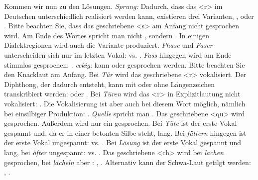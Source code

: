 Kommen wir nun zu den Lösungen. 
\ea
\ea \textit{Sprung:} Dadurch, dass das <r> im Deutschen unterschiedlich realisiert werden kann, existieren drei Varianten, \textipa{[SpKUN]}, \textipa{[Sp\;RUN]} oder \textipa{[SprUN]}. Bitte beachten Sie, dass das geschriebene <s> am Anfang nicht \textipa{[s]} gesprochen wird. Am Ende des Wortes spricht man nicht \textipa{[ng]}, sondern \textipa{[N]}. In einigen Dialektregionen wird auch die Variante \textipa{[SpKUNk]} produziert.
\ex \textit{Phase} und \textit{Faser} unterscheiden sich nur im letzten Vokal: \textipa{[\textprimstress fa:.z@]} vs. \textipa{[\textprimstress fa:.z5]}. \textit{Fass} hingegen wird am Ende stimmlos gesprochen: \textipa{[fas]}.
\ex \textit{eckig:} kann \textipa{[\textprimstress PE\.*kI\c{c}]} oder  gesprochen werden. Bitte beachten Sie den Knacklaut am Anfang.
\ex Bei \textit{Tür} wird das geschriebene <r> vokalisiert. Der Diphthong, der dadurch entsteht, kann mit oder ohne Längenzeichen transkribiert werden:  \textipa{[\textprimstress ty:5]} oder \textipa{[\textprimstress ty5]}. Bei \textit{Türen} wird das <r> in Explizitlautung nicht vokalisiert: \textipa{[\textprimstress ty:.K@n]}. Die Vokalisierung ist aber auch bei diesem Wort möglich, nämlich bei einsilbiger Produktion: \textipa{[\textprimstress ty:5n]}.
\ex \textit{Quelle} spricht man . Das geschriebene <qu> wird \textipa{[kv]} gesprochen. Außerdem wird nur ein \textipa{[l]} gesprochen.
\ex Bei \textit{Tüte} ist der erste Vokal gespannt und, da er in einer betonten Silbe steht, lang. Bei \textit{füttern} hingegen ist der erste Vokal ungespannt: \textipa{[\textprimstress ty:.t@]} vs. \textipa{[\textprimstress fY\.*t5n]}.
\ex Bei \textit{Lösung} ist der erste Vokal gespannt und lang, bei \textit{öfter} ungespannt:  vs. \textipa{[\textprimstress P\oe f.t5]}.
\ex Das geschriebene <ch> wird bei \textit{lachen} \textipa{[X]} gesprochen, bei \textit{lächeln} aber \textipa{[\c{c}]}: \textipa{[\textprimstress la\.*X@n]}, \textipa{[\textprimstress lE\.*{\c{c}}@ln]}. Alternativ kann der Schwa-Laut getilgt werden: \textipa{[\textprimstress la\.*X\s{n}}, \textipa{\textprimstress lE\.*{\c{c}}\s{l}n]}.
\z
\z


